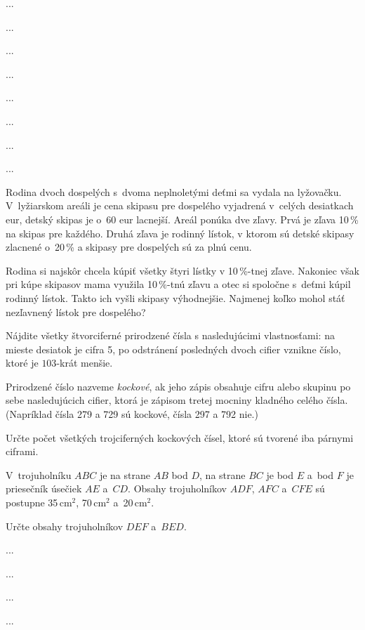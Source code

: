 {%
...}

{%
...}

{%
...}

{%
...}

{%
...}

{%
...}

{%
...}

{%
...}

{%
Rodina dvoch dospelých s~dvoma neplnoletými deťmi sa vydala na lyžovačku. V~lyžiarskom areáli je cena skipasu pre dospelého vyjadrená v~celých desiatkach eur, detský skipas je o~60 eur lacnejší. Areál ponúka dve zľavy. Prvá je zľava 10\,\% na skipas pre každého. Druhá zľava je rodinný lístok, v ktorom sú detské skipasy zlacnené o~20\,\% a skipasy pre dospelých sú za plnú cenu.

Rodina si najskôr chcela kúpiť všetky štyri lístky v 10\,\%-tnej zľave. Nakoniec však pri kúpe skipasov mama využila 10\,\%-tnú zľavu a otec si spoločne s~deťmi kúpil rodinný lístok. Takto ich vyšli skipasy výhodnejšie.  Najmenej koľko mohol stáť nezľavnený lístok pre dospelého?
}

{%
Nájdite všetky štvorciferné prirodzené čísla s nasledujúcimi vlastnosťami:
\itemitem{$\bullet$} na mieste desiatok je cifra 5,
\itemitem{$\bullet$} po odstránení posledných dvoch cifier vznikne číslo, ktoré je $103$-krát menšie.
}

{%
Prirodzené číslo nazveme {\it kockové\/}, ak jeho zápis obsahuje cifru alebo skupinu po sebe nasledujúcich cifier, ktorá je zápisom tretej mocniny kladného celého čísla.
(Napríklad čísla 279 a 729 sú kockové, čísla 297 a 792 nie.)

Určte počet všetkých trojciferných kockových čísel, ktoré sú tvorené iba párnymi ciframi.
}

{%
V~trojuholníku $ABC$ je na strane $AB$ bod $D$, na strane $BC$ je bod $E$ a~bod $F$ je priesečník úsečiek $AE$ a~$CD$.
Obsahy trojuholníkov $ADF$, $AFC$ a~$CFE$ sú postupne 35\,cm$^2$, 70\,cm$^2$ a~20\,cm$^2$.

Určte obsahy trojuholníkov $DEF$ a~$BED$.
}

{%
...}

{%
...}

{%
...}

{%
...}

